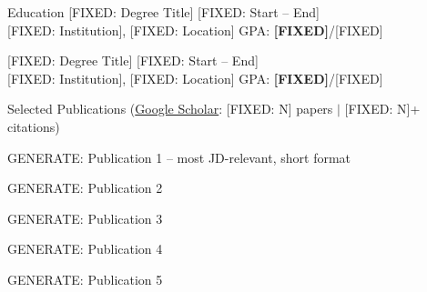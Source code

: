 \documentclass{resume}
\begin{document}

\begin{rSection}{Education}
{[FIXED: Degree Title]} \hfill {\textcolor{black!60}{[FIXED: Start -- End]}}\\
{[FIXED: Institution]}, [FIXED: Location] \hfill GPA: \textbf{[FIXED]}/[FIXED]

{[FIXED: Degree Title]} \hfill {\textcolor{black!60}{[FIXED: Start -- End]}}\\
{[FIXED: Institution]}, [FIXED: Location] \hfill GPA: \textbf{[FIXED]}/[FIXED]
\end{rSection}
\vspace{-0.15cm}

\begin{rSection2}{Selected Publications (\href{[CONFIG: Google Scholar URL]}{Google Scholar}: [FIXED: N] papers $\vert$ [FIXED: N]+ citations)}

\item [GENERATE: Publication 1 -- most JD-relevant, short format]

\item [GENERATE: Publication 2]

\item [GENERATE: Publication 3]

\item [GENERATE: Publication 4]

\item [GENERATE: Publication 5]

\end{rSection2}
\vspace{-0.15cm}
\end{document}
